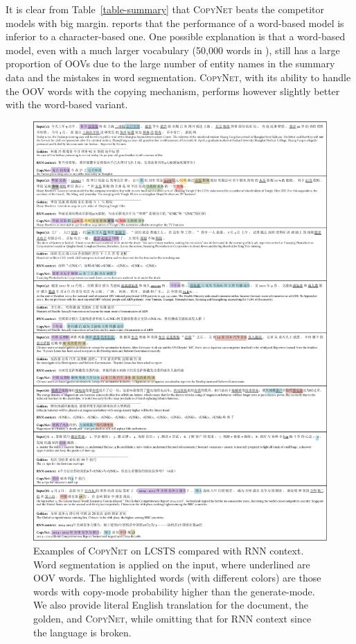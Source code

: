  
\vspace{-5pt}  
It is clear from Table~\ref{table-summary} that \textsc{CopyNet} beats the competitor models with big margin.  reports that the performance of a word-based model is inferior to a character-based one. One possible explanation is that a word-based model, even with a much larger vocabulary (50,000 words in ), still has a large proportion of OOVs due to the large number of entity names in the summary data and the mistakes in word segmentation. \textsc{CopyNet}, with its ability to handle the OOV words with the copying mechanism, performs however slightly better with the word-based variant.
 \begin{figure}[tpb]
   	\centering
          	\includegraphics[width=0.85\linewidth]{figs/copynet/summaryXYZ.pdf}  
          	\caption{\label{summary} Examples of \textsc{CopyNet} on LCSTS compared with RNN context. Word segmentation is applied on the input, where underlined are OOV words. The highlighted words (with different colors) are those words with copy-mode probability higher than the generate-mode.  We also provide literal English translation for the document, the golden, and \textsc{CopyNet}, while omitting that for RNN context since the language is broken.} 
   \vspace{-12pt}
  \end{figure}   

